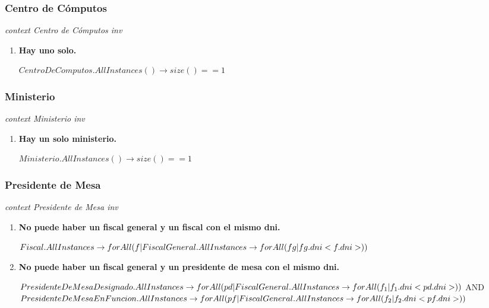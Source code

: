 \subsubsection*{Centro de C\'omputos}

\textit{context Centro de C\'omputos
inv}

\begin{enumerate}
\item \textbf{Hay uno solo.}

$CentroDeComputos.AllInstances() \rightarrow size()==1$
\end{enumerate}


\subsubsection*{Ministerio}

\textit{context Ministerio
inv}

\begin{enumerate}
\item \textbf{Hay un solo ministerio.}

$Ministerio.AllInstances() \rightarrow size()==1$

\end{enumerate}

\subsubsection*{Presidente de Mesa}

\textit{context Presidente de Mesa
inv}

\begin{enumerate}


\item \textbf{No puede haber un fiscal general y un fiscal con el mismo dni.}

$Fiscal.AllInstances \rightarrow \\
 forAll(f | FiscalGeneral.AllInstances \rightarrow forAll(fg | fg.dni <f.dni>))$

\item \textbf{No puede haber un fiscal general y un presidente de mesa con el mismo dni.}

$PresidenteDeMesaDesignado.AllInstances \rightarrow \\
 forAll(pd | FiscalGeneral.AllInstances \rightarrow forAll(f_1 | f_1.dni <pd.dni>)) \\ $
 AND $\\
 PresidenteDeMesaEnFuncion.AllInstances \rightarrow \\
 forAll(pf | FiscalGeneral.AllInstances \rightarrow forAll(f_2 | f_2.dni <pf.dni>))$
 
\end{enumerate}

